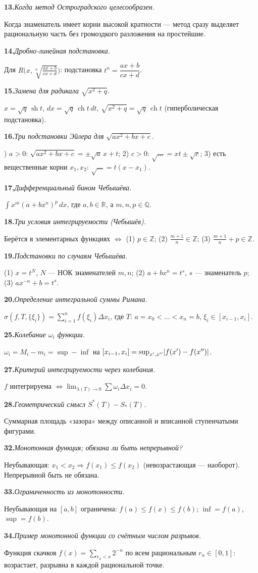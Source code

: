 \documentclass[10pt,a4paper]{article}
\DeclareMathOperator{\sh}{sh}
\DeclareMathOperator{\ch}{ch}
\newcommand{\R}{\mathbb{R}}
\newcommand{\Z}{\mathbb{Z}}
\newcommand{\Q}{\mathbb{Q}}
\newcommand{\dx}{\,dx}
\newcommand{\dt}{\,dt}
\renewcommand{\le}{\leqslant}
\DeclarePairedDelimiter{\abs}{\lvert}{\rvert}
\theoremstyle{definition}
\theoremstyle{plain}
\newcommand{\writespace}{\vspace{7.5mm}}
\newcommand{\faq}[3]{%
  \par\smallskip\noindent
  \textbf{#1.}\enspace\textit{#2}\par
  \nobreak\vspace{0.3ex}\noindent #3\par
  \writespace}
\begin{document}
\faq{13}{Когда метод Остроградского целесообразен.}{%
Когда знаменатель имеет корни высокой кратности — метод сразу выделяет рациональную часть без
громоздкого разложения на простейшие.}

\faq{14}{Дробно-линейная подстановка.}{%
Для $R\bigl(x,\sqrt[n]{\tfrac{ax+b}{cx+d}}\bigr)$: подстановка $t^n=\dfrac{ax+b}{cx+d}$.}

\faq{15}{Замена для радикала $\sqrt{x^2+q}$.}{%
$x=\sqrt q\,\sh t$, $dx=\sqrt q\,\ch t\dt$, $\sqrt{x^2+q}=\sqrt q\,\ch t$ (гиперболическая
подстановка).}

\faq{16}{Три подстановки Эйлера для $\sqrt{ax^2+bx+c}$.}{%
1) $a>0$: $\sqrt{ax^2+bx+c}=\pm\sqrt a\,x+t$; 2) $c>0$: $\sqrt{\dots}=xt\pm\sqrt c$;
3) есть вещественные корни $x_1,x_2$: $\sqrt{\dots}=t(x-x_1)$.}

\faq{17}{Дифференциальный бином Чебышёва.}{%
$\int x^m(a+bx^n)^p\dx$, где $a,b\in\R$, а $m,n,p\in\Q$.}

\faq{18}{Три условия интегрируемости (Чебышёв).}{%
Берётся в элементарных функциях $\iff$ (1) $p\in\Z$; (2) $\tfrac{m+1}{n}\in\Z$; (3)
$\tfrac{m+1}{n}+p\in\Z$.}

\faq{19}{Подстановки по случаям Чебышёва.}{%
(1) $x=t^N$, $N$ — НОК знаменателей $m,n$; (2) $a+bx^n=t^s$, $s$ — знаменатель $p$; (3)
$ax^{-n}+b=t^s$.}

\faq{20}{Определение интегральной суммы Римана.}{%
$\sigma(f,T,\{\xi_i\})=\sum_{i=1}^n f(\xi_i)\Delta x_i$, где $T:\,a=x_0<\dots<x_n=b$,
$\xi_i\in[x_{i-1},x_i]$.}

\faq{25}{Колебание $\omega_i$ функции.}{%
$\omega_i=M_i-m_i=\sup-\inf$ на $[x_{i-1},x_i]=\sup_{x',x''}\abs{f(x')-f(x'')}$.}

\faq{27}{Критерий интегрируемости через колебания.}{%
$f$ интегрируема $\iff\lim_{\lambda(T)\to0}\sum\omega_i\Delta x_i=0$.}

\faq{28}{Геометрический смысл $S^*(T)-S_*(T)$.}{%
Суммарная площадь «зазора» между описанной и вписанной ступенчатыми фигурами.}

\faq{32}{Монотонная функция; обязана ли быть непрерывной?}{%
Неубывающая: $x_1<x_2\Rightarrow f(x_1)\le f(x_2)$ (невозрастающая — наоборот). Непрерывной быть
не обязана.}

\faq{33}{Ограниченность из монотонности.}{%
Неубывающая на $[a,b]$ ограничена: $f(a)\le f(x)\le f(b)$; $\inf=f(a)$, $\sup=f(b)$.}

\faq{34}{Пример монотонной функции со счётным числом разрывов.}{%
Функция скачков $f(x)=\sum_{r_n<x}2^{-n}$ по всем рациональным $r_n\in[0,1]$: возрастает, разрывна
в каждой рациональной точке.}
\end{document}
